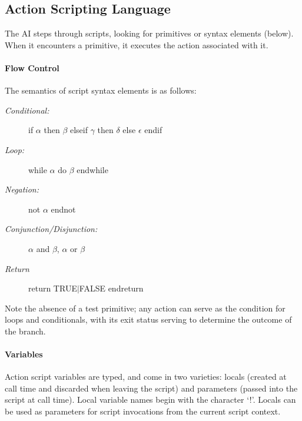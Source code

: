 \documentclass[11pt,letterpaper]{article}
\begin{document}
\subsection{Action Scripting Language}

The AI steps through scripts, looking for primitives or syntax 
elements (below).  When it encounters a primitive, it executes the 
action associated with it.

\paragraph{Flow Control} The semantics of script syntax elements is as 
follows:

\begin{description}

\item[\em Conditional:] if $\alpha$ then $\beta$ elseif $\gamma$ then 
$\delta$ else $\epsilon$ endif

\item[\em Loop:] while $\alpha$ do $\beta$ endwhile

\item[\em Negation:] not $\alpha$ endnot

\item[\em Conjunction/Disjunction:] $\alpha$ and $\beta$, $\alpha$ or 
$\beta$

\item[\em Return] return TRUE$|$FALSE endreturn
\end{description}

\noindent Note the absence of a test primitive; any action can serve 
as the condition for loops and conditionals, with its exit status 
serving to determine the outcome of the branch.

\paragraph{Variables}  Action script variables are typed, and come in 
two varieties: locals (created at call time and discarded when leaving 
the script) and parameters (passed into the script at call time).  
Local variable names begin with the character `!'.  Locals can be used 
as parameters for script invocations from the current script context.
\end{document}
